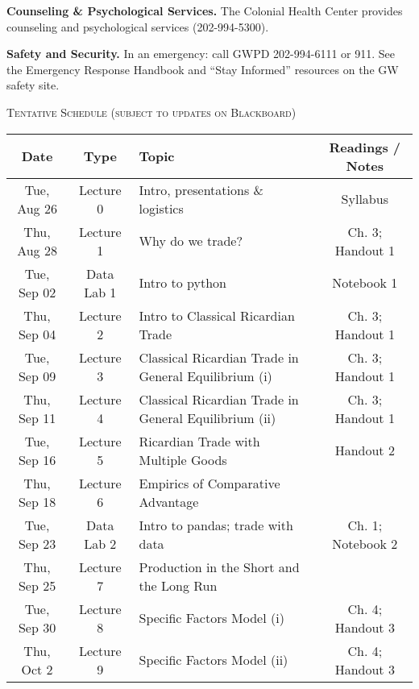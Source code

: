 \documentclass[11pt]{article}
\begin{document}
\smallskip
\textbf{Counseling \& Psychological Services.} The Colonial Health Center provides counseling and psychological services (202-994-5300).

\smallskip
\textbf{Safety and Security.} In an emergency: call GWPD 202-994-6111 or 911. See the Emergency Response Handbook and “Stay Informed” resources on the GW safety site.

\bigskip

\noindent\textsc{Tentative Schedule (subject to updates on Blackboard)}

\medskip
\begin{center}
\begin{tabular}{|c|c|l|c|}
\hline \textbf{Date} & \textbf{Type} & \textbf{Topic} & \textbf{Readings / Notes} \\ \hline
			
		Tue, Aug 26 & Lecture 0 & Intro, presentations \& logistics & Syllabus \\ \hline
		Thu, Aug 28 & Lecture 1  & Why do we trade? & Ch. 3; Handout 1 \\ \hline
		Tue, Sep 02 & Data Lab 1 & Intro to python & Notebook 1 \\ \hline
	    Thu, Sep 04 &Lecture 2 & Intro to Classical Ricardian Trade & Ch. 3; Handout 1 \\ \hline	
		Tue, Sep 09 & Lecture 3 & Classical Ricardian Trade in General Equilibrium (i) & Ch. 3; Handout 1 \\ \hline
		Thu, Sep 11 & Lecture 4 & Classical Ricardian Trade in General Equilibrium (ii) & Ch. 3; Handout 1 \\ \hline
		Tue, Sep 16 & Lecture 5 & Ricardian Trade with Multiple Goods & Handout 2 \\ \hline
		
		Thu, Sep 18 & Lecture 6 & Empirics of Comparative Advantage &  \textemdash  \\ \hline

		Tue, Sep 23 & Data Lab 2 & Intro to pandas; trade with data & Ch. 1; Notebook 2 \\ \hline

  	Thu, Sep 25 &  Lecture 7 & Production in the Short and the Long Run & \textemdash \\ \hline

        Tue, Sep 30 &  Lecture 8 & Specific Factors Model (i) & Ch. 4; Handout 3  \\ \hline

        Thu, Oct 2 &  Lecture 9 & Specific Factors Model (ii) & Ch. 4; Handout 3 \\ \hline


\end{tabular}
\end{center}
\end{document}
